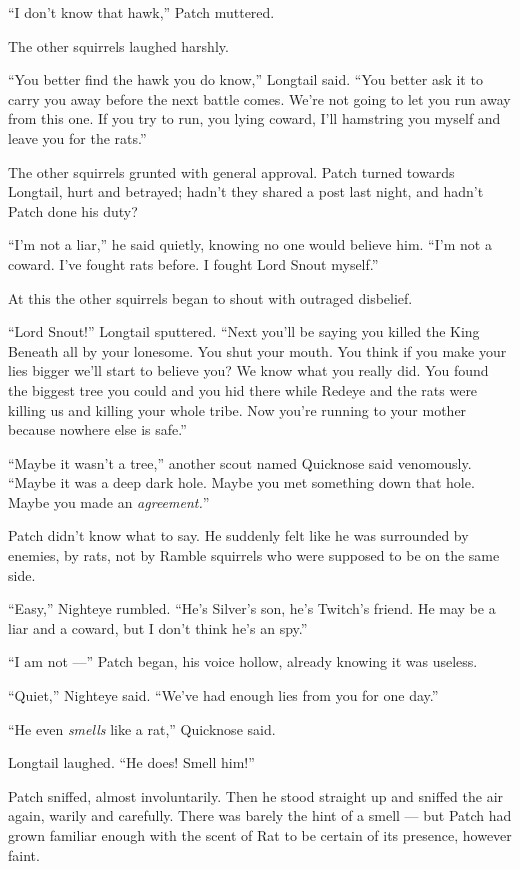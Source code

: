 \documentclass[12pt]{memoir}
\begin{document}
“I don’t know that hawk,” Patch muttered.

The other squirrels laughed harshly.

“You better find the hawk you do know,” Longtail said. “You better ask
it to carry you away before the next battle comes. We’re not going to
let you run away from this one. If you try to run, you lying coward,
I’ll hamstring you myself and leave you for the rats.”

The other squirrels grunted with general approval. Patch turned
towards Longtail, hurt and betrayed; hadn’t they shared a post last
night, and hadn’t Patch done his duty?

“I’m not a liar,” he said quietly, knowing no one would believe
him. “I’m not a coward. I’ve fought rats before. I fought Lord Snout
myself.”

At this the other squirrels began to shout with outraged disbelief.

“Lord Snout!” Longtail sputtered. “Next you’ll be saying you killed
the King Beneath all by your lonesome. You shut your mouth. You think
if you make your lies bigger we’ll start to believe you? We know what
you really did. You found the biggest tree you could and you hid there
while Redeye and the rats were killing us and killing your whole
tribe. Now you’re running to your mother because nowhere else is
safe.”

“Maybe it wasn’t a tree,” another scout named Quicknose said
venomously. “Maybe it was a deep dark hole. Maybe you met something
down that hole. Maybe you made an \textit{agreement.}”

Patch didn’t know what to say. He suddenly felt like he was surrounded
by enemies, by rats, not by Ramble squirrels who were supposed to be
on the same side.

“Easy,” Nighteye rumbled. “He’s Silver’s son, he’s Twitch’s friend. He
may be a liar and a coward, but I don’t think he’s an spy.”

“I am not —” Patch began, his voice hollow, already knowing it was
useless.

“Quiet,” Nighteye said. “We’ve had enough lies from you for one day.”

“He even \textit{smells} like a rat,” Quicknose said.

Longtail laughed. “He does! Smell him!”

Patch sniffed, almost involuntarily. Then he stood straight up and
sniffed the air again, warily and carefully. There was barely the hint
of a smell — but Patch had grown familiar enough with the scent of Rat
to be certain of its presence, however faint.
\end{document}
